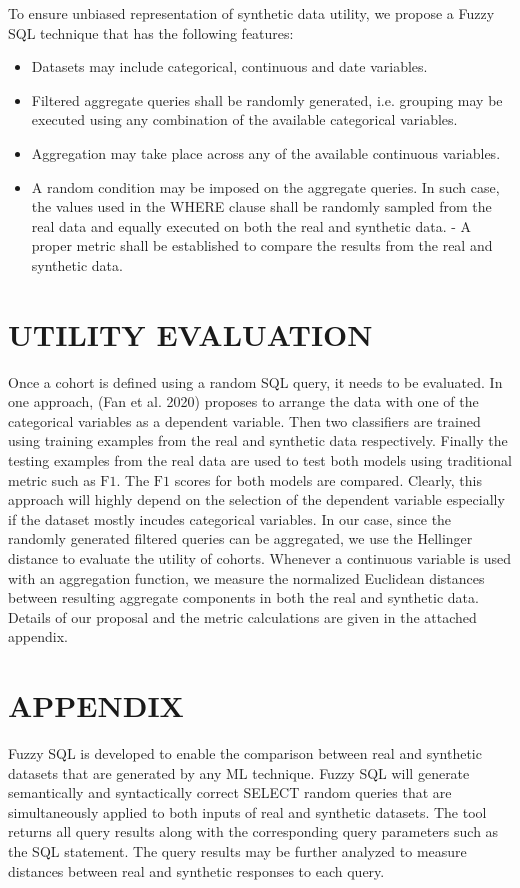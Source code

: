 \documentclass[10pt]{article}
\begin{document}
To ensure unbiased representation of synthetic data utility, we propose a Fuzzy SQL technique that has the following features:

\begin{itemize}
  \item Datasets may include categorical, continuous and date variables.

  \item Filtered aggregate queries shall be randomly generated, i.e. grouping may be executed using any combination of the available categorical variables.

  \item Aggregation may take place across any of the available continuous variables.

  \item A random condition may be imposed on the aggregate queries. In such case, the values used in the WHERE clause shall be randomly sampled from the real data and equally executed on both the real and synthetic data. - A proper metric shall be established to compare the results from the real and synthetic data.

\end{itemize}
\section{UTILITY EVALUATION}
Once a cohort is defined using a random SQL query, it needs to be evaluated. In one approach, (Fan et al. 2020) proposes to arrange the data with one of the categorical variables as a dependent variable. Then two classifiers are trained using training examples from the real and synthetic data respectively. Finally the testing examples from the real data are used to test both models using traditional metric such as $\mathrm{F} 1$. The $\mathrm{F} 1$ scores for both models are compared. Clearly, this approach will highly depend on the selection of the dependent variable especially if the dataset mostly incudes categorical variables. In our case, since the randomly generated filtered queries can be aggregated, we use the Hellinger distance to evaluate the utility of cohorts. Whenever a continuous variable is used with an aggregation function, we measure the normalized Euclidean distances between resulting aggregate components in both the real and synthetic data. Details of our proposal and the metric calculations are given in the attached appendix.

\section{APPENDIX}
Fuzzy SQL is developed to enable the comparison between real and synthetic datasets that are generated by any ML technique. Fuzzy SQL will generate semantically and syntactically correct SELECT random queries that are simultaneously applied to both inputs of real and synthetic datasets. The tool returns all query results along with the corresponding query parameters such as the SQL statement. The query results may be further analyzed to measure distances between real and synthetic responses to each query.
\end{document}
